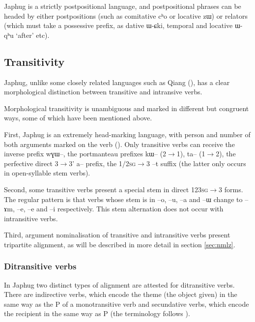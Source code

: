 \documentclass[oldfontcommands,oneside,a4paper,11pt]{article}
\newcommand{\ipa}[1]{{\phon #1}} %
\begin{document}
Japhug is a strictly postpositional language, and postpositional phrases can be headed by either postpositions (such as comitative \ipa{cʰo} or locative \ipa{zɯ}) or relators (which must take a possessive prefix, as dative \ipa{ɯ-ɕki}, temporal and locative  \ipa{ɯ-qʰu} `after' etc).

 

\subsection{Transitivity} \label{sec:trans}

Japhug, unlike some closely related languages such as Qiang (\citealt{lapolla11transitivity}), has a clear morphological distinction between transitive and intransive verbs. 

  Morphological transitivity is unambiguous and  marked in   different but congruent  ways, some of which have been mentioned above.

First,  Japhug  is an extremely head-marking language, with person and number of both arguments marked on the verb (\citealt{jacques10inverse}). Only transitive verbs can receive the inverse prefix \ipa{wɣɯ}--, the portmanteau prefixes \ipa{kɯ}-- (2$\rightarrow$1), \ipa{ta}-- (1$\rightarrow$2), the perfective direct 3$\rightarrow$3'  \ipa{a}-- prefix,  the 1/\textsc{2sg}$\rightarrow$3 --\ipa{t} suffix (the latter only occurs in open-syllable stem verbs).


Second,    some transitive verbs present a special stem in direct \textsc{123sg}$\rightarrow$3 forms. The regular pattern is that verbs whose stem is in --\ipa{o}, --\ipa{u}, --\ipa{a} and --\ipa{ɯ} change to --\ipa{ɤm}, --\ipa{e}, --\ipa{e} and --\ipa{i} respectively. This stem alternation does not occur with intransitive verbs.

Third, argument nominalisation of transitive   and intransitive  verbs present tripartite alignment, as will be described in more detail in section  \ref{sec:nmlz}.

\subsubsection{Ditransitive verbs} \label{sec:bitr}
 In Japhug two distinct types of alignment are attested for ditransitive verbs. There are indirective verbs, which encode the theme (the object given) in the same way as the P of a monotransitive verb and secundative verbs, which encode the recipient in the same way as P (the terminology follows \citealt{malchukov10ditransitive}).
\end{document}
